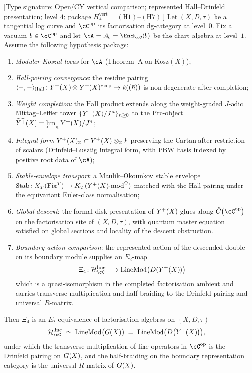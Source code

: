 \begin{theorem}
\label{thm:level-4-vertical}
\ClaimStatusConditional
\textup{[Type signature: Open/CY vertical comparison; represented
Hall--Drinfeld presentation; level $4$; package
$H_4^{\mathrm{vert}}=(\mathrm{H1})$--$(\mathrm{H7})$.]}
Let $(X,D,\tau)$ be a tangential log curve and $\cC^{\mathrm{op}}$
its factorisation dg-category at level~$0$. Fix a vacuum
$b\in\cC^{\mathrm{op}}$ and let $\cA = A_b = \End_\cC(b)$ be the
chart algebra at level~$1$. Assume the following hypothesis package:
\begin{enumerate}[label=\textup{(H\arabic*)},leftmargin=*]
\item \emph{Modular-Koszul locus} for $\cA$
(Theorem~\textup{A} on $\mathrm{Kosz}(X)$);
\item \emph{Hall-pairing convergence}: the residue pairing
$\langle{-},{-}\rangle_{\mathrm{Hall}}\colon
Y^{+}(X)\otimes Y^{+}(X)^{*\mathrm{cop}}\to k((\hbar))$
is non-degenerate after completion;
\item \emph{Weight completion}: the Hall product extends along the
weight-graded $J$-adic Mittag--Leffler tower
$\{Y^{+}(X)/J^{n}\}_{n\geq 0}$ to the Pro-object
$\widehat{Y^{+}}(X) = \varprojlim_n Y^{+}(X)/J^{n}$;
\item \emph{Integral form} $Y^{+}(X)_{\mathbb Z}\subset
Y^{+}(X)\otimes_{\mathbb Z}k$ preserving the Cartan after restriction
of scalars (Drinfeld--Lusztig integral form, with PBW basis indexed
by positive root data of $\cA$);
\item \emph{Stable-envelope transport}: a Maulik--Okounkov stable
envelope $\operatorname{Stab}\colon
K_T(\mathrm{Fix}^T)\to K_T(Y^{+}(X)\text{-mod}^{\heartsuit})$
matched with the Hall pairing under the equivariant Euler-class
normalisation;
\item \emph{Global descent}: the formal-disk presentation of
$Y^{+}(X)$ glues along $\check{C}\bigl(\cC^{\mathrm{op}}\bigr)$ on
the factorisation site of $(X,D,\tau)$, with quantum master equation
satisfied on global sections and locality of the descent obstruction.
\item \emph{Boundary action comparison}: the represented action of
the descended double on its boundary module supplies an $E_2$-map
\[
 \Xi_4\colon
 \Hbar^{\mathrm{line}}_\cC
 \longrightarrow
 \mathrm{LineMod}\!\left(D(\Yplus(X))\right)
\]
which is a quasi-isomorphism in the completed factorisation ambient
and carries transverse multiplication and half-braiding to the
Drinfeld pairing and universal $R$-matrix.
\end{enumerate}
Then $\Xi_4$ is an $E_2$-equivalence of factorisation algebras
on $(X,D,\tau)$
\begin{equation}\label{eq:level-4-vertical}
\Hbar^{\mathrm{line}}_\cC \;\simeq\;
\mathrm{LineMod}\bigl(\GX\bigr) \;=\;
\mathrm{LineMod}\bigl(D\bigl(\Yplus(X)\bigr)\bigr),
\end{equation}
under which the transverse multiplication of line operators in
$\cC^{\mathrm{op}}$ is the Drinfeld pairing on $G(X)$, and the
half-braiding on the boundary representation category is the
universal $R$-matrix of $G(X)$.
\end{theorem}

